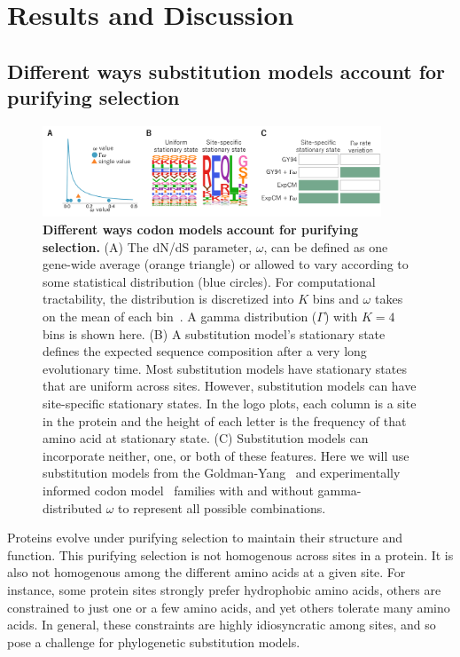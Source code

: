 \documentclass[11pt]{article}
\begin{document}
\section*{Results and Discussion}

\subsection*{Different ways substitution models account for purifying selection}

\begin{figure}
\centerline{\includegraphics[width=0.90\textwidth]{figures/model_feature.pdf}}
\caption{\label{fig:model_feature}
\textbf{Different ways codon models account for purifying selection.}
(A) The dN/dS parameter, $\omega$, can be defined as one gene-wide average (orange triangle) or allowed to vary according to some statistical distribution (blue circles). 
For computational tractability, the distribution is discretized into $K$ bins and $\omega$ takes on the mean of each bin~\citep{yang1994maximum,yang2000codon}. 
A gamma distribution ($\Gamma$) with $K=4$ bins is shown here.
(B) A substitution model's stationary state defines the expected sequence composition after a very long evolutionary time. 
Most substitution models have stationary states that are uniform across sites.
However, substitution models can have site-specific stationary states.
In the logo plots, each column is a site in the protein and the height of each letter is the frequency of that amino acid at stationary state. 
(C) Substitution models can incorporate neither, one, or both of these features.
Here we will use substitution models from the Goldman-Yang~\citep[GY94;][]{goldman1994codon,yang2000codon} and experimentally informed codon model~\citep[ExpCM;][]{hilton2017phydms} families with and without gamma-distributed $\omega$ to represent all possible combinations.
}
\end{figure}

Proteins evolve under purifying selection to maintain their structure and function. 
This purifying selection is not homogenous across sites in a protein.
It is also not homogenous among the different amino acids at a given site.
For instance, some protein sites strongly prefer hydrophobic amino acids, others are constrained to just one or a few amino acids, and yet others tolerate many amino acids.
In general, these constraints are highly idiosyncratic among sites, and so pose a challenge for phylogenetic substitution models.
\end{document}
